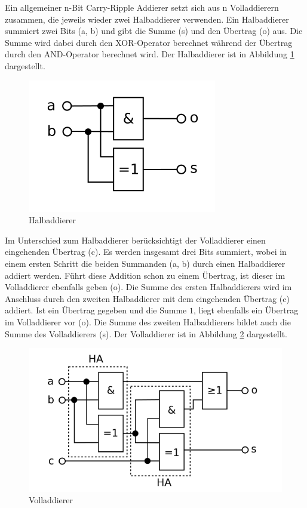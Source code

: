Ein allgemeiner n-Bit Carry-Ripple Addierer setzt sich aus n Volladdierern zusammen, die jeweils wieder zwei Halbaddierer verwenden. Ein Halbaddierer summiert zwei
Bits (a, b) und gibt die Summe (s) und den Übertrag (o) aus. Die Summe wird dabei durch den XOR-Operator berechnet während der Übertrag durch den AND-Operator
berechnet wird. Der Halbaddierer ist in Abbildung \ref{fig:halfadder} dargestellt.
\begin{figure}[!h]
  \centering
  \includegraphics[scale=1]{images/halfadder}
  \caption[Halbaddierer]{Halbaddierer\protect\footnotemark}
  \label{fig:halfadder}
\end{figure}

Im Unterschied zum Halbaddierer berücksichtigt der Volladdierer einen eingehenden Übertrag (c). Es werden insgesamt drei Bits summiert, wobei in einem ersten Schritt
die beiden Summanden (a, b) durch einen Halbaddierer addiert werden. Führt diese Addition schon zu einem Übertrag, ist dieser im Volladdierer ebenfalls geben (o).
Die Summe des ersten Halbaddierers wird im Anschluss durch den zweiten Halbaddierer mit dem eingehenden Übertrag (c) addiert. Ist ein Übertrag gegeben und die
Summe $1$, liegt ebenfalls ein Übertrag im Volladdierer vor (o). Die Summe des zweiten Halbaddierers bildet auch die Summe des Volladdierers (s). Der Volladdierer
ist in Abbildung \ref{fig:fulladder} dargestellt.
\begin{figure}[!h]
  \centering
  \includegraphics[scale=1]{images/fulladder}
  \caption[Volladdierer]{Volladdierer\protect\footnotemark}
  \label{fig:fulladder}
\end{figure}

